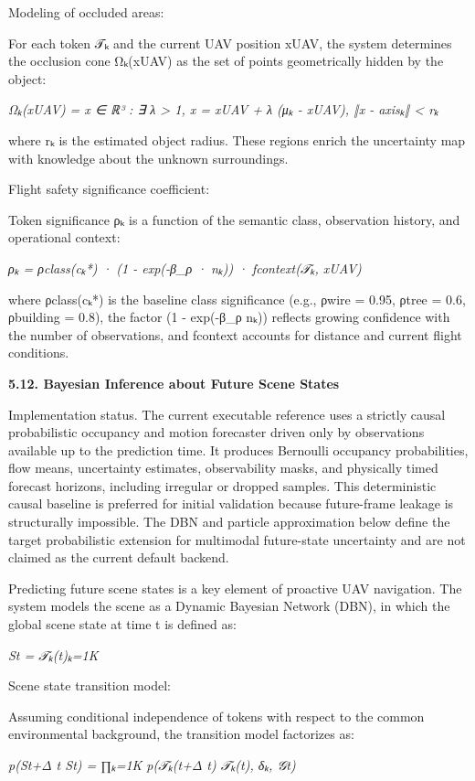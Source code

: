 \documentclass[
]{article}
\begin{document}
Modeling of occluded areas:

For each token 𝒯ₖ and the current UAV position xUAV, the system
determines the occlusion cone Ωₖ(xUAV) as the set of points
geometrically hidden by the object:

\emph{Ωₖ(xUAV) = x ∈ ℝ³ : ∃ λ \textgreater{} 1, x = xUAV + λ (μₖ -
xUAV), ‖x - axisₖ‖ \textless{} rₖ}

where rₖ is the estimated object radius. These regions enrich the
uncertainty map with knowledge about the unknown surroundings.

Flight safety significance coefficient:

Token significance ρₖ is a function of the semantic class, observation
history, and operational context:

\emph{ρₖ = ρclass(cₖ*) · (1 - exp(-β\_ρ · nₖ)) · fcontext(𝒯ₖ, xUAV)}

where ρclass(cₖ*) is the baseline class significance (e.g., ρwire =
0.95, ρtree = 0.6, ρbuilding = 0.8), the factor (1 - exp(-β\_ρ nₖ))
reflects growing confidence with the number of observations, and
fcontext accounts for distance and current flight conditions.

\textbf{5.12. Bayesian Inference about Future Scene States}

Implementation status. The current executable reference uses a strictly
causal probabilistic occupancy and motion forecaster driven only by
observations available up to the prediction time. It produces Bernoulli
occupancy probabilities, flow means, uncertainty estimates,
observability masks, and physically timed forecast horizons, including
irregular or dropped samples. This deterministic causal baseline is
preferred for initial validation because future-frame leakage is
structurally impossible. The DBN and particle approximation below define
the target probabilistic extension for multimodal future-state
uncertainty and are not claimed as the current default backend.

Predicting future scene states is a key element of proactive UAV
navigation. The system models the scene as a Dynamic Bayesian Network
(DBN), in which the global scene state at time t is defined as:

\emph{St = 𝒯ₖ(t)ₖ=1K}

Scene state transition model:

Assuming conditional independence of tokens with respect to the common
environmental background, the transition model factorizes as:

\emph{p(St+Δ t \textbar{} St) = ∏ₖ=1K p(𝒯ₖ(t+Δ t) \textbar{} 𝒯ₖ(t), δₖ,
𝒢t)}
\end{document}
